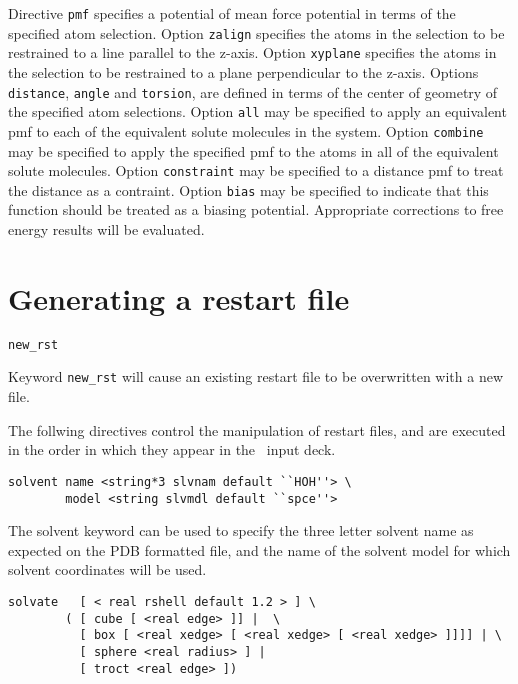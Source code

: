 Directive \verb+pmf+ specifies a potential of mean force potential
in terms of the specified atom selection. Option \verb+zalign+ specifies
the atoms in the selection to be restrained to a line parallel to the
z-axis. Option \verb+xyplane+ specifies the atoms in the selection to 
be restrained to a plane perpendicular to the z-axis. Options
\verb+distance+, \verb+angle+ and \verb+torsion+, are defined in terms
of the center of geometry of the specified atom selections.
Option \verb+all+ may be specified to apply an equivalent pmf to each 
of the equivalent solute molecules in the system.
Option \verb+combine+ may be specified to apply the specified pmf to 
the atoms in all of the equivalent solute molecules.
Option \verb+constraint+ may be specified to a distance pmf to treat
the distance as a contraint.
Option \verb+bias+ may be specified to indicate that this function
should be treated as a biasing potential. Appropriate corrections
to free energy results will be evaluated.

\section{Generating a restart file}

\begin{verbatim}
new_rst
\end{verbatim}

Keyword \verb+new_rst+ will cause an existing restart file to be
overwritten with a new file.

The follwing directives control the manipulation of restart
files, and are executed in the order in which they
appear in the \prepare\ input deck.

\begin{verbatim}
solvent name <string*3 slvnam default ``HOH''> \
        model <string slvmdl default ``spce''>
\end{verbatim}

The solvent keyword can be used to specify the three letter solvent name 
as expected on the PDB formatted file, and the name of the solvent model
for which solvent coordinates will be used.

\begin{verbatim}
solvate   [ < real rshell default 1.2 > ] \
        ( [ cube [ <real edge> ]] |  \
          [ box [ <real xedge> [ <real xedge> [ <real xedge> ]]]] | \
          [ sphere <real radius> ] |
          [ troct <real edge> ])
\end{verbatim}

